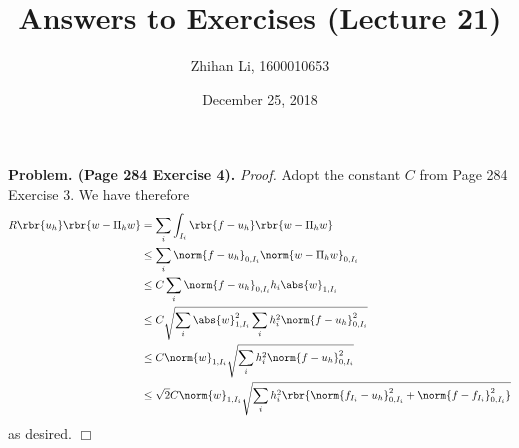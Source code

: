 \documentclass[english, nochinese]{pnote}
\title{Answers to Exercises (Lecture 21)}
\author{Zhihan Li, 1600010653}
\date{December 25, 2018}
\begin{document}
\maketitle

\textbf{Problem. (Page 284 Exercise 4).} \textit{Proof.} Adopt the constant $C$ from Page 284 Exercise 3. We have therefore
\begin{equation}
\begin{split}
R \rbr{u_h} \rbr{ w - \Pi_h w } &= \sum_i \int_{I_i} \rbr{ f - u_h } \rbr{ w - \Pi_h w } \\
&\le \sum_i \norm{ f - u_h }_{ 0, I_i } \norm{ w - \Pi_h w }_{ 0, I_i } \\
&\le C \sum_i \norm{ f - u_h }_{ 0, I_i } h_i \abs{w}_{ 1, I_i } \\
&\le C \sqrt{ \sum_i \abs{w}_{ 1, I_i }^2 \sum_i h_i^2 \norm{ f - u_h }_{ 0, I_i }^2 } \\
&\le C \norm{w}_{ 1, I_i } \sqrt{ \sum_i h_i^2 \norm{ f - u_h }_{ 0, I_i }^2 } \\
&\le \sqrt{2} C \norm{w}_{ 1, I_i } \sqrt{ \sum_i h_i^2 \rbr{ \norm{ f_{I_i} - u_h }_{ 0, I_i }^2 + \norm{ f - f_{I_i} }_{ 0, I_i }^2 } }
\end{split}
\end{equation}
as desired.
\hfill$\Box$
\end{document}
